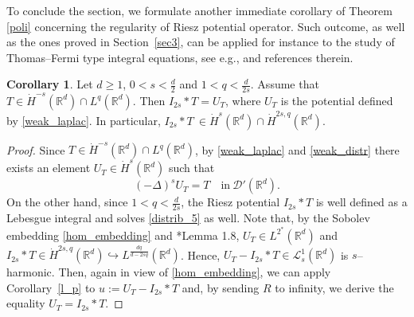 \documentclass[letterpaper, 11pt,  reqno]{amsart}
\theoremstyle{definition}
\newtheorem{corollary}{Corollary}[section]
\theoremstyle{remark}
\numberwithin{equation}{section}
\newcommand{\R}{{\mathbb R}}
\begin{document}
To conclude the section, we formulate another immediate corollary of Theorem {\ref{poli}} concerning the regularity of Riesz potential operator. 
Such outcome, as well as the ones proved in Section~{\ref{sec3}, can be applied for instance to the study of Thomas--Fermi type integral equations, see e.g., \cite{TF} and references therein.}
\begin{corollary}\label{riesz_sobolev} 
	Let $d\ge 1$, $0<s<\tfrac{d}{2}$ and $1< q<\frac{d}{2s}$. Assume that $T\in \dot{H}^{-s}(\R^d)\cap L^{q}(\R^d)$. Then $I_{2s}*T=U_T$, where $U_T$ is the potential defined by \eqref{weak_laplac}. In particular, ${I_{2s}*T}~\in \dot H^{s}(\R^d)\cap \dot H^{2s,q}(\R^d)$.
\end{corollary}
	\begin{proof}
		Since $T\in \dot{H}^{-s}(\R^d)\cap L^{q}(\R^d)$, by \eqref{weak_laplac} and \eqref{weak_distr} there exists an element ${U}_T\in \dot{H}^{s}(\R^d)$ such that 
		\begin{equation}\label{distrib_5}
			(-\Delta)^s U_T=T\quad \text{in}\ \mathscr{D}'(\R^d).
		\end{equation}
		On the other hand, since $1<q<\frac{d}{2s}$, the Riesz potential $I_{2s}*T$  is well defined as a Lebesgue integral and solves \eqref{distrib_5} as well. Note that, by the Sobolev embedding \eqref{hom_embedding} and  \cite{mazya}*{Lemma 1.8},  ${U}_T\in L^{2^*}(\R^d)$ and $I_{2s}*T\in \dot H^{2s,q}(\R^d)\hookrightarrow L^{\frac{dq}{d-2sq}}(\R^d) $. Hence, ${U}_T-I_{2s}*T \in \mathscr{L}^{1}_s(\R^d)$ is $s$--harmonic.
		Then, again in view of \eqref{hom_embedding}, we can  apply Corollary~{\ref{l_p}} to $u:=U_T-I_{2s}*T$ and, by sending $R$ to infinity, we derive the equality
		${U}_T=I_{2s}*T$. 
	\end{proof}
\end{document}
